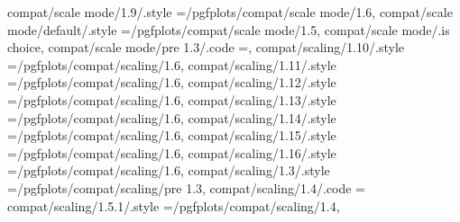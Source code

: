 {{{{{{{{{{{{{{{{{{{compat/scale mode/1.9/.style                                       ={/pgfplots/compat/scale mode/1.6},                                                                                                 
compat/scale mode/default/.style                                   ={/pgfplots/compat/scale mode/1.5},                                                                                                 
compat/scale mode/.is choice,
compat/scale mode/pre 1.3/.code                                    =\def\pgfplots@compat@scale@mode@compatible@mode{1},                                                                               
compat/scaling/1.10/.style                                         ={/pgfplots/compat/scaling/1.6},                                                                                                    
compat/scaling/1.11/.style                                         ={/pgfplots/compat/scaling/1.6},                                                                                                    
compat/scaling/1.12/.style                                         ={/pgfplots/compat/scaling/1.6},                                                                                                    
compat/scaling/1.13/.style                                         ={/pgfplots/compat/scaling/1.6},                                                                                                    
compat/scaling/1.14/.style                                         ={/pgfplots/compat/scaling/1.6},                                                                                                    
compat/scaling/1.15/.style                                         ={/pgfplots/compat/scaling/1.6},                                                                                                    
compat/scaling/1.16/.style                                         ={/pgfplots/compat/scaling/1.6},                                                                                                    
compat/scaling/1.3/.style                                          ={/pgfplots/compat/scaling/pre 1.3},                                                                                                
compat/scaling/1.4/.code                                           ={                                                                                                                                 
compat/scaling/1.5.1/.style                                        ={/pgfplots/compat/scaling/1.4},                                                                                                    
}}}}}}}}}}}}}}}}}}}}
